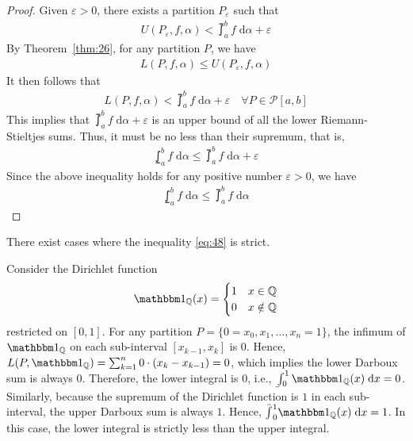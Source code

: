 \documentclass[thmcnt=section, 12pt]{my-elegantbook}
\begin{document}
\begin{proof}
    Given $\varepsilon > 0$, there exists a partition $P_\varepsilon$ such that
    \begin{align*}
        U(P_\varepsilon,f,\alpha) < \upint_a^b f \; \mathrm{d}\alpha + \varepsilon
    \end{align*}
    By Theorem~\ref{thm:26}, for any partition $P$, we have
    \begin{align*}
        L(P,f,\alpha) \leq U(P_\varepsilon,f,\alpha)
    \end{align*}
    It then follows that
    \begin{align*}
        L(P,f,\alpha) < \upint_a^b f \; \mathrm{d}\alpha + \varepsilon
        \quad \forall P \in \mathcal{P}[a,b]
    \end{align*}
    This implies that $\upint_a^b f \; \mathrm{d}\alpha + \varepsilon$ is an upper bound of all the lower Riemann-Stieltjes sums. Thus, it must be no less than their supremum, that is,
    \begin{align*}
        \lowint_a^b f \; \mathrm{d}\alpha
        \leq
        \upint_a^b f \; \mathrm{d}\alpha + \varepsilon
    \end{align*}
    Since the above inequality holds for any positive number $\varepsilon > 0$, we have
    \begin{align*}
        \lowint_a^b f \; \mathrm{d}\alpha
        \leq \upint_a^b f \; \mathrm{d}\alpha
    \end{align*}
\end{proof}

There exist cases where the inequality \eqref{eq:48} is strict.

\begin{example}
    Consider the Dirichlet function
    \begin{align*}
        \ind_{\Q} (x) = \begin{cases}
                            1 & x \in \Q    \\
                            0 & x \notin \Q
                        \end{cases}
    \end{align*}
    restricted on $[0,1]$. For any partition $P = \{0=x_0, x_1, \ldots, x_n=1\}$, the infimum of $\ind_{\Q}$ on each sub-interval $[x_{k-1}, x_k]$ is $0$. Hence, $L(P,\ind_{\Q}) = \sum_{k=1}^n 0 \cdot (x_k - x_{k-1}) = 0$, which implies the lower Darboux sum is always $0$. Therefore, the lower integral is $0$, i.e., $\lowint_0^1 \ind_\Q(x) \; \mathrm{d}x = 0$. Similarly, because the supremum of the Dirichlet function is $1$ in each sub-interval, the upper Darboux sum is always $1$. Hence, $\upint_0^1 \ind_\Q(x) \; \mathrm{d}x = 1$. In this case, the lower integral is strictly less than the upper integral.
    \label{eg:5}
\end{example}
\end{document}
